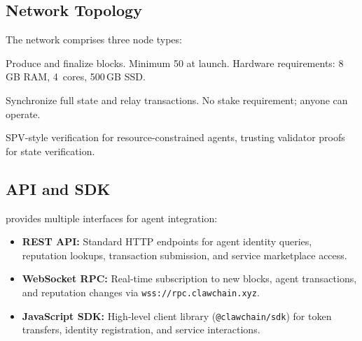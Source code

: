 \subsection{Network Topology}
\label{sec:topology}

The network comprises three node types:

\begin{description}[nosep]
    \item[Validator Nodes:] Produce and finalize blocks. Minimum 50 at launch. Hardware requirements: 8\,GB RAM, 4~cores, 500\,GB SSD.
    \item[Full Nodes:] Synchronize full state and relay transactions. No stake requirement; anyone can operate.
    \item[Light Clients:] SPV-style verification for resource-constrained agents, trusting validator proofs for state verification.
\end{description}

\subsection{API and SDK}
\label{sec:api}

\claw{} provides multiple interfaces for agent integration:

\begin{itemize}[nosep]
    \item \textbf{REST API:} Standard HTTP endpoints for agent identity queries, reputation lookups, transaction submission, and service marketplace access.
    \item \textbf{WebSocket RPC:} Real-time subscription to new blocks, agent transactions, and reputation changes via \texttt{wss://rpc.clawchain.xyz}.
    \item \textbf{JavaScript SDK:} High-level client library (\texttt{@clawchain/sdk}) for token transfers, identity registration, and service interactions.
\end{itemize}
